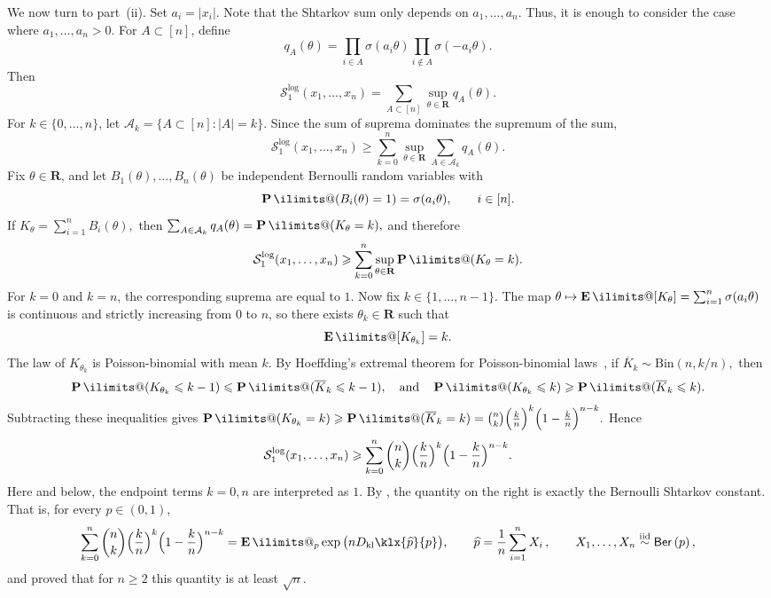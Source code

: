 \documentclass[11pt, letterpaper, hidelinks]{article}
\makeatletter
\renewcommand{\proofname}{\textit{\textbf{Proof}}}
\renewenvironment{proof}[1][\proofname]{\par\pushQED{\qed}\normalfont \topsep6\p@\@plus6\p@\relax\trivlist\item[\hskip\labelsep#1\@addpunct{}]\ignorespaces}{\popQED\endtrivlist\@endpefalse}
\newcommand{\R}{\mathbf R}
\newcommand{\1}{\mathbf 1}
\renewcommand{\ge}{\geqslant}
\renewcommand{\leq}{\leqslant}
\renewcommand{\geq}{\geqslant}
\newcommand{\kl}{D_{\rm kl}\klx}
\newcommand{\E}{\operatorname*{\mathbf{E}}\ilimits@}
\renewcommand{\P}{\operatorname*{\mathbf{P}}\ilimits@}
\theoremstyle{plain}
\theoremstyle{definition}
\newcommand{\defn}{=}
\let\hat\widehat
\newcommand{\Ber}[1]{\mathsf{Ber}\left(#1\right)}
\makeatother
\begin{document}
\begin{proof}
We now turn to part~(ii). Set $a_i \defn |x_i|$. Note that the Shtarkov sum only depends on $a_1,\dots,a_n$. Thus, it is enough to consider the case where $a_1,\dots,a_n>0$. For $A \subset [n]$, define
\[
q_A(\theta)
\defn
\prod_{i\in A}\sigma(a_i\theta)\prod_{i\notin A}\sigma(-a_i\theta).
\]
Then
\[
\mathcal{S}_1^{\operatorname{log}}(x_1,\dots,x_n)
=
\sum_{A\subset[n]} \sup_{\theta\in\R} q_A(\theta).
\]
For $k\in\{0,\dots,n\}$, let $
\mathcal A_k \defn \{A\subset[n]: |A|=k\}.
$
Since the sum of suprema dominates the supremum of the sum,
\[
\mathcal{S}_1^{\operatorname{log}}(x_1,\dots,x_n)
\ge
\sum_{k=0}^n
\sup_{\theta\in\R}
\sum_{A\in \mathcal A_k} q_A(\theta).
\]
Fix $\theta\in\R$, and let $B_1(\theta),\dots,B_n(\theta)$ be independent Bernoulli random variables with
\[
\P(B_i(\theta)=1)=\sigma(a_i\theta),
\qquad i\in[n].
\]
If
$
K_\theta \defn \sum_{i=1}^n B_i(\theta),
$
then
$
\sum_{A\in \mathcal A_k} q_A(\theta)=\P(K_\theta=k),
$
and therefore
\[
\mathcal{S}_1^{\operatorname{log}}(x_1,\dots,x_n)
\ge
\sum_{k=0}^n \sup_{\theta\in\R}\P(K_\theta=k).
\]
For $k=0$ and $k=n$, the corresponding suprema are equal to $1$. Now fix $k\in\{1,\dots,n-1\}$. The map
$
\theta \mapsto \E[K_\theta]
=
\sum_{i=1}^n \sigma(a_i\theta)
$
is continuous and strictly increasing from $0$ to $n$, so there exists $\theta_k\in\R$ such that
\[
\E[K_{\theta_k}] = k.
\]
The law of $K_{\theta_k}$ is Poisson-binomial with mean $k$. By Hoeffding's extremal theorem for Poisson-binomial laws~\cite[Theorem~4]{Hoeffding1956}, if
$
\overline K_k \sim \mathrm{Bin}(n,k/n),
$
then
\[
\P(K_{\theta_k}\leq k-1)\leq \P(\overline K_k\leq k-1),
\quad\textrm{and} \quad
\P(K_{\theta_k}\leq k)\geq \P(\overline K_k\leq k).
\]
Subtracting these inequalities gives
$
\P(K_{\theta_k}=k)
\ge
\P(\overline K_k = k)
=
\binom{n}{k}\Bigl(\frac{k}{n}\Bigr)^k\Bigl(1-\frac{k}{n}\Bigr)^{n-k}.
$
Hence
\[
\mathcal{S}_1^{\operatorname{log}}(x_1,\dots,x_n)
\ge
\sum_{k=0}^n
\binom{n}{k}\Bigl(\frac{k}{n}\Bigr)^k\Bigl(1-\frac{k}{n}\Bigr)^{n-k}.
\]
Here and below, the endpoint terms $k=0,n$ are interpreted as $1$.
By \cite[Proof of Theorem~1]{maurer2004note}, the quantity on the right is exactly the Bernoulli Shtarkov constant. That is, for every $p\in(0, 1)$,
\[
\sum_{k=0}^n
\binom{n}{k}\Bigl(\frac{k}{n}\Bigr)^k\Bigl(1-\frac{k}{n}\Bigr)^{n-k}
=
\E_p \exp\big(n\kl{\hat p}{p}\big),
\qquad
\hat p=\frac1n\sum_{i=1}^n X_i \, ,
\qquad
X_1,\dots,X_n \stackrel{\mathrm{iid}}{\sim}\Ber{p},
\]
and \cite[Theorem~1]{maurer2004note} proved that for $n\geq 2$ this quantity is at least $\sqrt n$. 


\end{proof}
\end{document}

